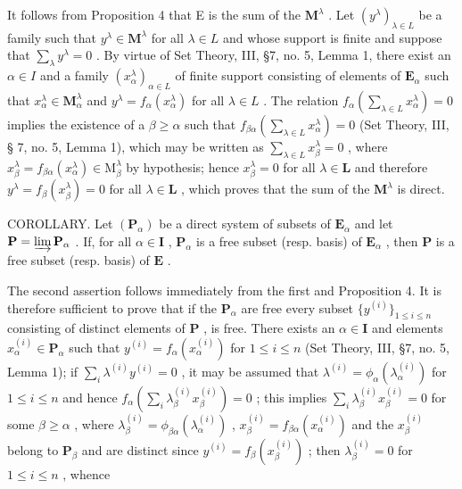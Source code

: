 It follows from Proposition 4 that E is the sum of the \(\mathbf{M}^{\lambda}\) . Let \((y^{\lambda})_{\lambda \in L}\) be a family such that \(y^{\lambda} \in \mathbf{M}^{\lambda}\) for all \(\lambda \in L\) and whose support is finite and suppose that \(\sum_{\lambda} y^{\lambda} = 0\) . By virtue of Set Theory, III, §7, no. 5, Lemma 1, there exist an \(\alpha \in I\) and a family \((x_{\alpha}^{\lambda})_{\alpha \in L}\) of finite support consisting of elements of \(\mathbf{E}_{\alpha}\) such that \(x_{\alpha}^{\lambda} \in \mathbf{M}_{\alpha}^{\lambda}\) and \(y^{\lambda} = f_{\alpha}(x_{\alpha}^{\lambda})\) for all \(\lambda \in L\) . The relation \(f_{\alpha}\left(\sum_{\lambda \in L} x_{\alpha}^{\lambda}\right) = 0\) implies the existence of a \(\beta \geqslant \alpha\) such that \(f_{\beta \alpha}\left(\sum_{\lambda \in L} x_{\alpha}^{\lambda}\right) = 0\) (Set Theory, III, § 7, no. 5, Lemma 1), which may be written as \(\sum_{\lambda \in L} x_{\beta}^{\lambda} = 0\) , where \(x_{\beta}^{\lambda} = f_{\beta \alpha}(x_{\alpha}^{\lambda}) \in \mathrm{M}_{\beta}^{\lambda}\) by hypothesis; hence \(x_{\beta}^{\lambda} = 0\) for all \(\lambda \in \mathbf{L}\) and therefore \(y^{\lambda} = f_{\beta}(x_{\beta}^{\lambda}) = 0\) for all \(\lambda \in \mathbf{L}\) , which proves that the sum of the \(\mathbf{M}^{\lambda}\) is direct.

COROLLARY. Let \((\mathbf{P}_{\alpha})\) be a direct system of subsets of \(\mathbf{E}_{\alpha}\) and let \(\mathbf{P} = \varinjlim \mathbf{P}_{\alpha}\) . If, for all \(\alpha \in \mathbf{I}\) , \(\mathbf{P}_{\alpha}\) is a free subset (resp. basis) of \(\mathbf{E}_{\alpha}\) , then \(\mathbf{P}\) is a free subset (resp. basis) of \(\mathbf{E}\) .

The second assertion follows immediately from the first and Proposition 4. It is therefore sufficient to prove that if the \(\mathbf{P}_{\alpha}\) are free every subset \(\{y^{(i)}\}_{1\leqslant i\leqslant n}\) consisting of distinct elements of \(\mathbf{P}\) , is free. There exists an \(\alpha \in \mathbf{I}\) and elements \(x_{\alpha}^{(i)}\in \mathbf{P}_{\alpha}\) such that \(y^{(i)} = f_{\alpha}(x_{\alpha}^{(i)})\) for \(1\leqslant i\leqslant n\) (Set Theory, III, §7, no. 5, Lemma 1); if \(\sum_{i}\lambda^{(i)}y^{(i)} = 0\) , it may be assumed that \(\lambda^{(i)} = \phi_{\alpha}(\lambda_{\alpha}^{(i)})\) for \(1\leqslant i\leqslant n\) and hence \(f_{\alpha}\left(\sum_{i}\lambda_{\beta}^{(i)}x_{\beta}^{(i)}\right) = 0\) ; this implies \(\sum_{i}\lambda_{\beta}^{(i)}x_{\beta}^{(i)} = 0\) for some \(\beta \geqslant \alpha\) , where \(\lambda_{\beta}^{(i)} = \phi_{\beta \alpha}(\lambda_{\alpha}^{(i)})\) , \(x_{\beta}^{(i)} = f_{\beta \alpha}(x_{\alpha}^{(i)})\) and the \(x_{\beta}^{(i)}\) belong to \(\mathbf{P}_{\beta}\) and are distinct since \(y^{(i)} = f_{\beta}(x_{\beta}^{(i)})\) ; then \(\lambda_{\beta}^{(i)} = 0\) for \(1\leqslant i\leqslant n\) , whence

